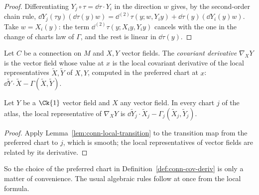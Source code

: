 \begin{proof}
  \leanok
  Differentiating $Y_j \circ \tau = \dd\tau \cdot Y_i$ in the direction $w$ gives, by the
  second-order chain rule,
  $\dd Y_j(\tau y)(\dd\tau(y) w) = \dd^{(2)}\tau(y; w, Y_i y) + \dd\tau(y)(\dd Y_i(y) w)$. Take
  $w = X_i(y)$: the term $\dd^{(2)}\tau(y; X_i y, Y_i y)$ cancels with the one in the change of
  charts law of $\Gamma$, and the rest is linear in $\dd\tau(y)$.
\end{proof}

\begin{definition}
  \label{def:conn-cov-deriv}
  \leanok
  Let $C$ be a connection on $M$ and $X, Y$ vector fields. The \emph{covariant derivative}
  $\nabla_X Y$ is the vector field whose value at $x$ is the local covariant derivative of the
  local representatives $\tilde X, \tilde Y$ of $X, Y$, computed in the preferred chart at $x$:
  $\dd\tilde Y \cdot \tilde X - \Gamma(\tilde X, \tilde Y)$.
\end{definition}

\begin{theorem}
  \label{thm:conn-cov-deriv-chart}
  \leanok
  Let $Y$ be a $\Ck{1}$ vector field and $X$ any vector field. In every chart $j$ of the atlas,
  the local representative of $\nabla_X Y$ is
  $\dd\tilde Y_j \cdot \tilde X_j - \Gamma_j(\tilde X_j, \tilde Y_j)$.
\end{theorem}

\begin{proof}
  \leanok
  Apply Lemma~\ref{lem:conn-local-transition} to the transition map from the preferred chart to
  $j$, which is smooth; the local representatives of vector fields are related by its
  derivative.
\end{proof}

So the choice of the preferred chart in Definition~\ref{def:conn-cov-deriv} is only a matter of
convenience. The usual algebraic rules follow at once from the local formula.

